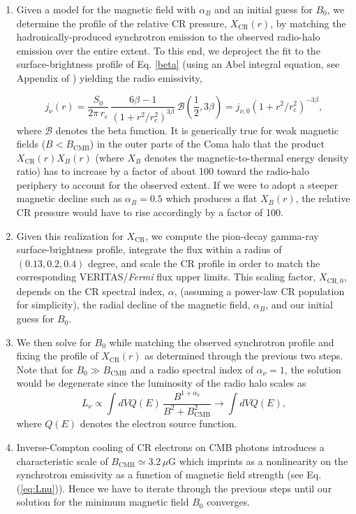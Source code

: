 \documentclass[12pt,manuscript]{aastex}
\def\Fermi{{\em Fermi}\xspace}
\newcommand{\rmn}{\mathrm}
\newcommand{\CR}{\mathrm{CR}}
\begin{document}
\begin{enumerate}
\item
Given a model for the magnetic field with $\alpha_B$ and an initial guess for $B_0$, we determine
the profile of the relative CR pressure, $X_{\CR}(r)$, by matching the hadronically-produced
synchrotron emission to the observed radio-halo emission over the entire extent. To 
this end, we deproject the fit to the surface-brightness profile of Eq. \ref{beta} (using an Abel
integral equation, see Appendix of \citealt{article:PfrommerEnsslin:2004b}) yielding the radio
emissivity,

\begin{equation}
\label{eq:Coma:radio}
j_{\nu} (r) = \frac{S_{0}}{2\pi\, r_{\rmn{c}}}\,
\frac{6\beta - 1}{\left(1 + r^{2}/r_{\rmn{c}}^{2}\right)^{3 \beta}}\,
\mathcal{B}\left(\frac{1}{2}, 3\beta\right)
= j_{\nu,0} \left(1 + r^2/r_{\rmn{c}}^{2}\right)^{-3 \beta},
\end{equation}
where $\mathcal{B}$ denotes the beta function. It is generically true for weak magnetic fields
($B<B_{\rmn{CMB}}$) in the outer parts of the Coma halo that the product $X_{\CR}(r)X_{B}(r)$
(where $X_B$ denotes the magnetic-to-thermal energy density ratio) has to increase by a factor of
about 100 toward the radio-halo periphery to account for the observed extent. If we were to adopt a
steeper magnetic decline such as $\alpha_{B}=0.5$ which produces a flat $X_{B}(r)$, the relative CR
pressure would have to rise accordingly by a factor of 100.

\item
Given this realization for $X_{\CR}$, we compute the pion-decay gamma-ray surface-brightness
profile, integrate the flux within a radius of $(0.13, 0.2, 0.4)$ degree, and scale the CR profile
in order to match the corresponding VERITAS/\Fermi flux upper limits. This scaling factor,
$X_{\CR,0}$, depends on the CR spectral index, $\alpha$, (assuming a power-law CR population for
simplicity), the radial decline of the magnetic field, $\alpha_{B}$, and our initial guess for
$B_{0}$.

\item
We then solve for $B_{0}$ while matching the observed synchrotron profile and fixing the profile
of $X_{\CR}(r)$ as determined through the previous two steps. Note
that for $B_{0} \gg B_{\rmn{CMB}}$ and a radio spectral index of $\alpha_{\nu}=1$, the solution
would be degenerate since the luminosity of the radio halo scales as
\begin{equation}
\label{eq:Lnu}
L_{\nu} \propto \int dV Q(E)\,\frac{B^{1+\alpha_\nu}}{B^2 + B_{\rmn{CMB}}^2} \to \int dV Q(E),
\end{equation}
where $Q(E)$ denotes the electron source function.

\item Inverse-Compton cooling of CR electrons on CMB photons introduces a characteristic scale of
  $B_{\rmn{CMB}}\simeq 3.2\,\mu$G which imprints as a nonlinearity on the synchrotron emissivity as
  a function of magnetic field strength (see Eq. (\ref{eq:Lnu})). Hence we have to iterate through
  the previous steps until our solution for the minimum magnetic field $B_{0}$ converges.
\end{enumerate}
\end{document}

